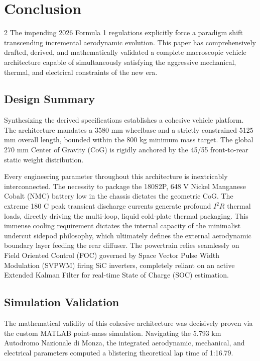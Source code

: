 \section{Conclusion}

\begin{multicols}{2}
The impending 2026 Formula 1 regulations explicitly force a paradigm shift transcending incremental aerodynamic evolution. This paper has comprehensively drafted, derived, and mathematically validated a complete macroscopic vehicle architecture capable of simultaneously satisfying the aggressive mechanical, thermal, and electrical constraints of the new era.

\subsection{Design Summary}

Synthesizing the derived specifications establishes a cohesive vehicle platform. The architecture mandates a 3580 mm wheelbase and a strictly constrained 5125 mm overall length, bounded within the 800 kg minimum mass target. The global 270 mm Center of Gravity (CoG) is rigidly anchored by the 45/55 front-to-rear static weight distribution.

Every engineering parameter throughout this architecture is inextricably interconnected. The necessity to package the 180S2P, 648 V Nickel Manganese Cobalt (NMC) battery low in the chassis dictates the geometric CoG. The extreme 180 C peak transient discharge currents generate profound $I^2R$ thermal loads, directly driving the multi-loop, liquid cold-plate thermal packaging. This immense cooling requirement dictates the internal capacity of the minimalist undercut sidepod philosophy, which ultimately defines the external aerodynamic boundary layer feeding the rear diffuser. The powertrain relies seamlessly on Field Oriented Control (FOC) governed by Space Vector Pulse Width Modulation (SVPWM) firing SiC inverters, completely reliant on an active Extended Kalman Filter for real-time State of Charge (SOC) estimation.

\subsection{Simulation Validation}

The mathematical validity of this cohesive architecture was decisively proven via the custom MATLAB point-mass simulation. Navigating the 5.793 km Autodromo Nazionale di Monza, the integrated aerodynamic, mechanical, and electrical parameters computed a blistering theoretical lap time of 1:16.79. 


\end{multicols}
